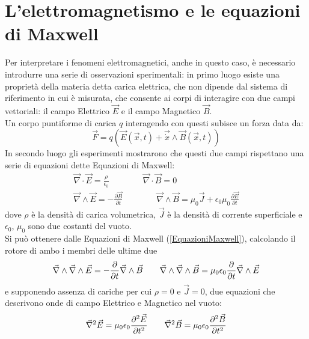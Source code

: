 \section{L'elettromagnetismo e le equazioni di Maxwell}
Per interpretare i fenomeni elettromagnetici, anche in questo caso, è necessario introdurre
una serie di osservazioni sperimentali: in primo luogo esiste una proprietà della materia 
detta carica elettrica, che non dipende dal sistema di riferimento in cui è misurata, che consente 
ai corpi di interagire con due campi vettoriali: 
il campo Elettrico $\vec{E}$ e il campo Magnetico $\vec{B}$.\\ Un corpo puntiforme di carica 
$q$ interagendo con questi subisce un forza data da:
\begin{equation}
	\vec{F}=q(\vec{E}(\vec{x},t)+\vec{\dot{x}}\wedge\vec{B}(\vec{x},t))
	\label{ForzaLorentz}
\end{equation}
In secondo luogo gli esperimenti mostrarono che questi due campi rispettano una serie di equazioni 
dette Equazioni di Maxwell:
\begin{equation}
	\begin{gathered}
		\vec{\nabla}\cdot\vec{E}=\frac{\rho}{\epsilon_0} \qquad \qquad \vec{\nabla}\cdot\vec{B}=0 \\
		\vec{\nabla}\wedge\vec{E}=-\frac{\partial\vec{B}}{\partial t} \qquad \qquad \vec{\nabla}\wedge
		\vec{B}=\mu_0\vec{J}+\epsilon_0\mu_0\frac{\partial\vec{E}}{\partial t}
		\label{EquazioniMaxwell}
	\end{gathered}
\end{equation}
dove $\rho$ è la densità di carica volumetrica, $\vec{J}$ è la densità di corrente superficiale e 
$\epsilon_0$, $\mu_0$ sono due costanti del vuoto.\\

Si può ottenere dalle Equazioni di Maxwell (\ref{EquazioniMaxwell}), calcolando il rotore di ambo 
i membri delle ultime due
\begin{equation*}
	\vec{\nabla}\wedge\vec{\nabla}\wedge\vec{E}=-\frac{\partial}{\partial t}\vec{\nabla}\wedge\vec{B} 
	\qquad \vec{\nabla}\wedge\vec{\nabla}\wedge\vec{B}=\mu_0\epsilon_0\frac{\partial}{\partial t}
	\vec{\nabla}\wedge\vec{E}
\end{equation*}
e supponendo assenza di cariche per cui $\rho=0$ e $\vec{J}=0$, due equazioni che descrivono 
onde di campo Elettrico e Magnetico nel vuoto:
\begin{equation}
	\vec{\nabla}^2\vec{E}=\mu_0\epsilon_0\frac{\partial^2\vec{E}}{\partial t^2} \qquad \vec{\nabla}^2\vec{B}=
	\mu_0\epsilon_0\frac{\partial^2\vec{B}}{\partial t^2}
\end{equation}

